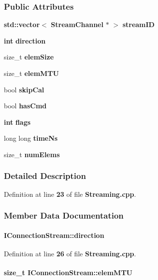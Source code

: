 \subsubsection*{Public Attributes}
\begin{DoxyCompactItemize}
\item 
{\bf std\+::vector}$<$ {\bf Stream\+Channel} $\ast$ $>$ {\bf stream\+ID}
\item 
{\bf int} {\bf direction}
\item 
size\+\_\+t {\bf elem\+Size}
\item 
size\+\_\+t {\bf elem\+M\+TU}
\item 
bool {\bf skip\+Cal}
\item 
bool {\bf has\+Cmd}
\item 
{\bf int} {\bf flags}
\item 
long long {\bf time\+Ns}
\item 
size\+\_\+t {\bf num\+Elems}
\end{DoxyCompactItemize}


\subsubsection{Detailed Description}


Definition at line {\bf 23} of file {\bf Streaming.\+cpp}.



\subsubsection{Member Data Documentation}
\paragraph[{direction}]{ I\+Connection\+Stream\+::direction}\label{structIConnectionStream_aa8af9f701a0c55acaf955459034c76fb}


Definition at line {\bf 26} of file {\bf Streaming.\+cpp}.

\paragraph[{elem\+M\+TU}]{\setlength{\rightskip}{0pt plus 5cm}size\+\_\+t I\+Connection\+Stream\+::elem\+M\+TU}\label{structIConnectionStream_a1ac625b8668c37e6c916b331f8f39eb6}


